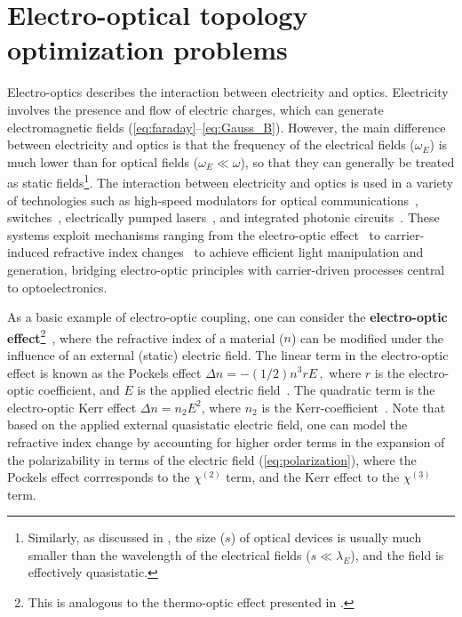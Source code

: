 \chapter{Electro-optical topology optimization problems}\label{chap:eo}
Electro-optics describes the interaction between electricity and optics. Electricity involves the presence and flow of electric charges, which can generate electromagnetic fields (\eqref{eq:faraday}--\eqref{eq:Gauss_B}).
However, the main difference between electricity and optics is that the frequency of the electrical fields ($\omega_E$)
is much lower than for optical fields ($\omega_E \ll \omega $), so that they can generally be treated as static fields\footnote{Similarly, as discussed in , the size ($s$) of optical devices
is usually much smaller than the wavelength of the electrical fields ($s\ll \lambda_E $), and the field is effectively quasistatic.}.
The interaction between electricity and optics is used in a variety of technologies such as high-speed modulators for optical communications~\cite{modu, modu1, modu2, pockels}, switches~\cite{eo_switch}, electrically pumped lasers~\cite{laser,laser_pic}, and integrated photonic circuits~\cite{laser_pic}. 
These systems exploit mechanisms ranging from the electro-optic effect~\cite{eo_effect} to carrier-induced refractive index
 changes~\cite{c_i_n} to achieve efficient light manipulation and generation, bridging electro-optic principles with carrier-driven processes central to optoelectronics.

As a basic example of electro-optic coupling, one can consider the \textbf{electro-optic effect}\footnote{This is analogous to the thermo-optic effect presented in .}~\cite{eo_effect},
where the refractive index of a material ($n$) can be modified under the influence of an external (static) electric field. The linear term in the electro-optic effect is known as the
Pockels effect $
    \Delta n = -(1/2) n^3 r E\,,$
where $r$ is the electro-optic coefficient, and $E$ is the applied electric field~\cite{pockels}. The quadratic term 
is the electro-optic Kerr effect $\Delta n = n_2 E^2$, where $n_2$ is the Kerr-coefficient~\cite{phot_crys}. Note that based on the applied external
quasistatic electric field, one can model the refractive index change by accounting for higher order terms in the expansion of the polarizability
in terms of the electric field (\eqref{eq:polarization}), where the Pockels effect corrresponds to the $\chi^{(2)}$ term, and the Kerr effect to the $\chi^{(3)}$ term.

